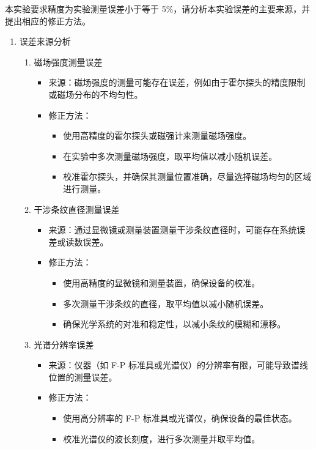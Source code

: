 \documentclass[dvipsnames, svgnames,a4paper,11pt]{article}
\begin{document}
	
	\begin{question}
		本实验要求精度为实验测量误差小于等于 5\%，请分析本实验误差的主要来源，并提出相应的修正方法。
	\end{question}
	\begin{enumerate}
		\item 误差来源分析
		\begin{enumerate}
			\item 磁场强度测量误差
			\begin{itemize}
				\item 来源：磁场强度的测量可能存在误差，例如由于霍尔探头的精度限制或磁场分布的不均匀性。
				\item 修正方法：
				\begin{itemize}
					\item 使用高精度的霍尔探头或磁强计来测量磁场强度。
					\item 在实验中多次测量磁场强度，取平均值以减小随机误差。
					\item 校准霍尔探头，并确保其测量位置准确，尽量选择磁场均匀的区域进行测量。
				\end{itemize}
			\end{itemize}
			
			\item 干涉条纹直径测量误差
			\begin{itemize}
				\item 来源：通过显微镜或测量装置测量干涉条纹直径时，可能存在系统误差或读数误差。
				\item 修正方法：
				\begin{itemize}
					\item 使用高精度的显微镜和测量装置，确保设备的校准。
					\item 多次测量干涉条纹的直径，取平均值以减小随机误差。
					\item 确保光学系统的对准和稳定性，以减小条纹的模糊和漂移。
				\end{itemize}
			\end{itemize}
			
			\item 光谱分辨率误差
			\begin{itemize}
				\item 来源：仪器（如 F-P 标准具或光谱仪）的分辨率有限，可能导致谱线位置的测量误差。
				\item 修正方法：
				\begin{itemize}
					\item 使用高分辨率的 F-P 标准具或光谱仪，确保设备的最佳状态。
					\item 校准光谱仪的波长刻度，进行多次测量并取平均值。
				\end{itemize}
			\end{itemize}
			

\end{enumerate}
\end{enumerate}
\end{document}
